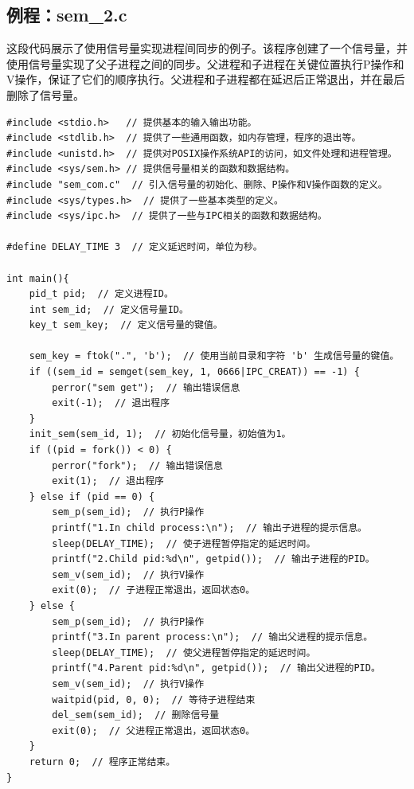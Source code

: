 \documentclass[12pt, a4paper, oneside]{ctexbook}
\numberwithin{figure}{section}
\begin{document}
\subsection{例程：sem_2.c}
这段代码展示了使用信号量实现进程间同步的例子。该程序创建了一个信号量，并使用信号量实现了父子进程之间的同步。父进程和子进程在关键位置执行P操作和V操作，保证了它们的顺序执行。父进程和子进程都在延迟后正常退出，并在最后删除了信号量。
\begin{verbatim}
#include <stdio.h>   // 提供基本的输入输出功能。
#include <stdlib.h>  // 提供了一些通用函数，如内存管理，程序的退出等。
#include <unistd.h>  // 提供对POSIX操作系统API的访问，如文件处理和进程管理。
#include <sys/sem.h> // 提供信号量相关的函数和数据结构。
#include "sem_com.c"  // 引入信号量的初始化、删除、P操作和V操作函数的定义。
#include <sys/types.h>  // 提供了一些基本类型的定义。
#include <sys/ipc.h>  // 提供了一些与IPC相关的函数和数据结构。

#define DELAY_TIME 3  // 定义延迟时间，单位为秒。

int main(){
    pid_t pid;  // 定义进程ID。
    int sem_id;  // 定义信号量ID。
    key_t sem_key;  // 定义信号量的键值。

    sem_key = ftok(".", 'b');  // 使用当前目录和字符 'b' 生成信号量的键值。
    if ((sem_id = semget(sem_key, 1, 0666|IPC_CREAT)) == -1) {
        perror("sem get");  // 输出错误信息
        exit(-1);  // 退出程序
    }
    init_sem(sem_id, 1);  // 初始化信号量，初始值为1。
    if ((pid = fork()) < 0) {
        perror("fork");  // 输出错误信息
        exit(1);  // 退出程序
    } else if (pid == 0) {
        sem_p(sem_id);  // 执行P操作
        printf("1.In child process:\n");  // 输出子进程的提示信息。
        sleep(DELAY_TIME);  // 使子进程暂停指定的延迟时间。
        printf("2.Child pid:%d\n", getpid());  // 输出子进程的PID。
        sem_v(sem_id);  // 执行V操作
        exit(0);  // 子进程正常退出，返回状态0。
    } else {
        sem_p(sem_id);  // 执行P操作
        printf("3.In parent process:\n");  // 输出父进程的提示信息。
        sleep(DELAY_TIME);  // 使父进程暂停指定的延迟时间。
        printf("4.Parent pid:%d\n", getpid());  // 输出父进程的PID。
        sem_v(sem_id);  // 执行V操作
        waitpid(pid, 0, 0);  // 等待子进程结束
        del_sem(sem_id);  // 删除信号量
        exit(0);  // 父进程正常退出，返回状态0。
    }
    return 0;  // 程序正常结束。
}

\end{verbatim}
\end{document}
